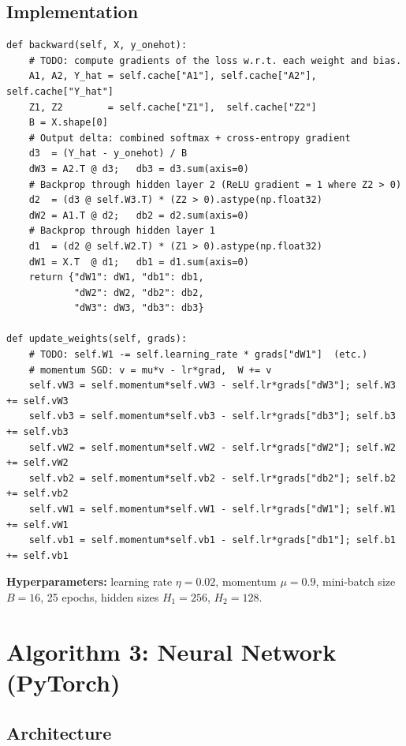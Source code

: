 \documentclass[12pt]{article}
\begin{document}
\subsection{Implementation}

\begin{lstlisting}[caption={Backpropagation and momentum weight update (\texttt{q1b\_neural\_net\_scratch\_digits.py})}, label=lst:scratch]
def backward(self, X, y_onehot):
    # TODO: compute gradients of the loss w.r.t. each weight and bias.
    A1, A2, Y_hat = self.cache["A1"], self.cache["A2"], self.cache["Y_hat"]
    Z1, Z2        = self.cache["Z1"],  self.cache["Z2"]
    B = X.shape[0]
    # Output delta: combined softmax + cross-entropy gradient
    d3  = (Y_hat - y_onehot) / B
    dW3 = A2.T @ d3;   db3 = d3.sum(axis=0)
    # Backprop through hidden layer 2 (ReLU gradient = 1 where Z2 > 0)
    d2  = (d3 @ self.W3.T) * (Z2 > 0).astype(np.float32)
    dW2 = A1.T @ d2;   db2 = d2.sum(axis=0)
    # Backprop through hidden layer 1
    d1  = (d2 @ self.W2.T) * (Z1 > 0).astype(np.float32)
    dW1 = X.T  @ d1;   db1 = d1.sum(axis=0)
    return {"dW1": dW1, "db1": db1,
            "dW2": dW2, "db2": db2,
            "dW3": dW3, "db3": db3}

def update_weights(self, grads):
    # TODO: self.W1 -= self.learning_rate * grads["dW1"]  (etc.)
    # momentum SGD: v = mu*v - lr*grad,  W += v
    self.vW3 = self.momentum*self.vW3 - self.lr*grads["dW3"]; self.W3 += self.vW3
    self.vb3 = self.momentum*self.vb3 - self.lr*grads["db3"]; self.b3 += self.vb3
    self.vW2 = self.momentum*self.vW2 - self.lr*grads["dW2"]; self.W2 += self.vW2
    self.vb2 = self.momentum*self.vb2 - self.lr*grads["db2"]; self.b2 += self.vb2
    self.vW1 = self.momentum*self.vW1 - self.lr*grads["dW1"]; self.W1 += self.vW1
    self.vb1 = self.momentum*self.vb1 - self.lr*grads["db1"]; self.b1 += self.vb1
\end{lstlisting}

\textbf{Hyperparameters:} learning rate $\eta = 0.02$, momentum $\mu = 0.9$,
mini-batch size $B = 16$, 25 epochs, hidden sizes $H_1 = 256$, $H_2 = 128$.

\section{Algorithm 3: Neural Network (PyTorch)}
\label{sec:pytorch}

\subsection{Architecture}
\end{document}
